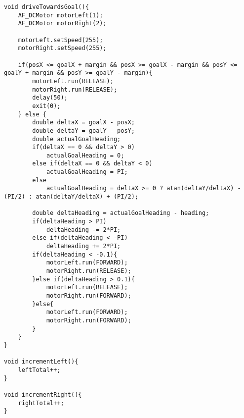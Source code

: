 \begin{lstlisting}[caption={Finished arduino code for the project}, label={ArduinoCode}]
void driveTowardsGoal(){
	AF_DCMotor motorLeft(1);
	AF_DCMotor motorRight(2);
	
	motorLeft.setSpeed(255);
	motorRight.setSpeed(255);
	
	if(posX <= goalX + margin && posX >= goalX - margin && posY <= goalY + margin && posY >= goalY - margin){
		motorLeft.run(RELEASE);
		motorRight.run(RELEASE);
		delay(50);
		exit(0);
	} else {
		double deltaX = goalX - posX;
		double deltaY = goalY - posY;
		double actualGoalHeading;
		if(deltaX == 0 && deltaY > 0)
			actualGoalHeading = 0;
		else if(deltaX == 0 && deltaY < 0)
			actualGoalHeading = PI;
		else
			actualGoalHeading = deltaX >= 0 ? atan(deltaY/deltaX) - (PI/2) : atan(deltaY/deltaX) + (PI/2);
	
		double deltaHeading = actualGoalHeading - heading;
		if(deltaHeading > PI)
			deltaHeading -= 2*PI;
		else if(deltaHeading < -PI)
			deltaHeading += 2*PI;
		if(deltaHeading < -0.1){
			motorLeft.run(FORWARD);
			motorRight.run(RELEASE);
		}else if(deltaHeading > 0.1){
			motorLeft.run(RELEASE);
			motorRight.run(FORWARD);
		}else{
			motorLeft.run(FORWARD);
			motorRight.run(FORWARD);
		}
	}
}

void incrementLeft(){
	leftTotal++;
}

void incrementRight(){
	rightTotal++;
}

\end{lstlisting}

